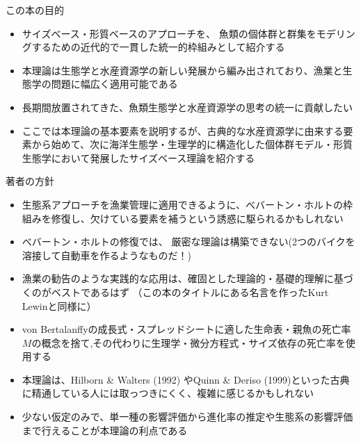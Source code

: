 \documentclass[
  ignorenonframetext,
]{beamer}
\providecommand{\tightlist}{%
  \setlength{\itemsep}{0pt}\setlength{\parskip}{0pt}}
\begin{document}
\begin{frame}{この本の目的}
\protect\hypertarget{ux3053ux306eux672cux306eux76eeux7684}{}

\begin{itemize}
\tightlist
\item
  サイズベース・形質ベースのアプローチを、
  魚類の個体群と群集をモデリングするための近代的で一貫した統一的枠組みとして紹介する\\
  \vspace{3mm}
\item
  本理論は生態学と水産資源学の新しい発展から編み出されており、漁業と生態学の問題に幅広く適用可能である\\
  \vspace{3mm}
\item
  長期間放置されてきた、魚類生態学と水産資源学の思考の統一に貢献したい\\
  \vspace{3mm}
\item
  ここでは本理論の基本要素を説明するが、古典的な水産資源学に由来する要素から始めて、次に海洋生態学・生理学的に構造化した個体群モデル・形質生態学において発展したサイズベース理論を紹介する
\end{itemize}

\end{frame}

\begin{frame}{著者の方針}
\protect\hypertarget{ux8457ux8005ux306eux65b9ux91dd}{}

\begin{itemize}
\tightlist
\item
  生態系アプローチを漁業管理に適用できるように、べバートン・ホルトの枠組みを修復し、欠けている要素を補うという誘惑に駆られるかもしれない\\
\item
  べバートン・ホルトの修復では、
  厳密な理論は構築できない(2つのバイクを溶接して自動車を作るようなものだ！)\\
\item
  漁業の勧告のような実践的な応用は、確固とした理論的・基礎的理解に基づくのがベストであるはず
  （この本のタイトルにある名言を作ったKurt Lewinと同様に）\\
\item
  von
  Bertalanffyの成長式・スプレッドシートに適した生命表・親魚の死亡率\(M\)の概念を捨て,その代わりに生理学・微分方程式・サイズ依存の死亡率を使用する\\
\item
  本理論は、Hilborn \& Walters (1992) やQuinn \& Deriso
  (1999)といった古典に精通している人には取っつきにくく、複雑に感じるかもしれない\\
\item
  少ない仮定のみで、単一種の影響評価から進化率の推定や生態系の影響評価まで行えることが本理論の利点である
\end{itemize}

\end{frame}
\end{document}
